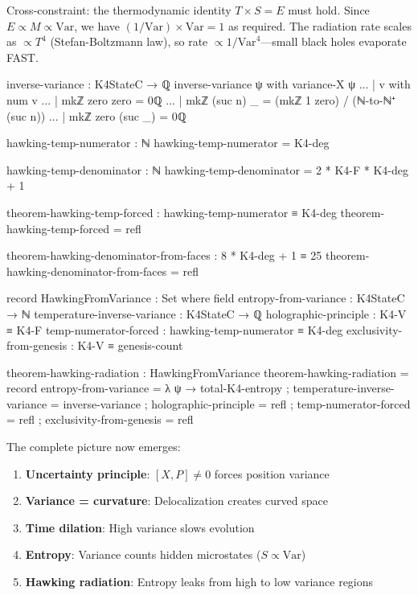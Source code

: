 \documentclass[11pt,a4paper]{book}
\begin{document}
Cross-constraint: the thermodynamic identity $T \times S = E$ must hold. Since $E \propto M \propto \text{Var}$, we have $(1/\text{Var}) \times \text{Var} = 1$ as required. The radiation rate scales as $\propto T^4$ (Stefan-Boltzmann law), so rate $\propto 1/\text{Var}^4$---small black holes evaporate FAST.

\begin{code}
inverse-variance : K4StateC → ℚ
inverse-variance ψ with variance-X ψ
... | v with num v
...   | mkℤ zero zero = 0ℚ
...   | mkℤ (suc n) _ = (mkℤ 1 zero) / (ℕ-to-ℕ⁺ (suc n))
...   | mkℤ zero (suc _) = 0ℚ

hawking-temp-numerator : ℕ
hawking-temp-numerator = K4-deg

hawking-temp-denominator : ℕ
hawking-temp-denominator = 2 * K4-F * K4-deg + 1

theorem-hawking-temp-forced : hawking-temp-numerator ≡ K4-deg
theorem-hawking-temp-forced = refl

theorem-hawking-denominator-from-faces : 8 * K4-deg + 1 ≡ 25
theorem-hawking-denominator-from-faces = refl

record HawkingFromVariance : Set where
  field
    entropy-from-variance : K4StateC → ℕ
    temperature-inverse-variance : K4StateC → ℚ
    holographic-principle : K4-V ≡ K4-F
    temp-numerator-forced : hawking-temp-numerator ≡ K4-deg
    exclusivity-from-genesis : K4-V ≡ genesis-count

theorem-hawking-radiation : HawkingFromVariance
theorem-hawking-radiation = record
  { entropy-from-variance = λ ψ → total-K4-entropy
  ; temperature-inverse-variance = inverse-variance
  ; holographic-principle = refl
  ; temp-numerator-forced = refl
  ; exclusivity-from-genesis = refl
  }
\end{code}

The complete picture now emerges:

\begin{enumerate}
\item \textbf{Uncertainty principle}: $[X,P] \neq 0$ forces position variance
\item \textbf{Variance = curvature}: Delocalization creates curved space
\item \textbf{Time dilation}: High variance slows evolution
\item \textbf{Entropy}: Variance counts hidden microstates ($S \propto \text{Var}$)
\item \textbf{Hawking radiation}: Entropy leaks from high to low variance regions
\end{enumerate}
\end{document}
